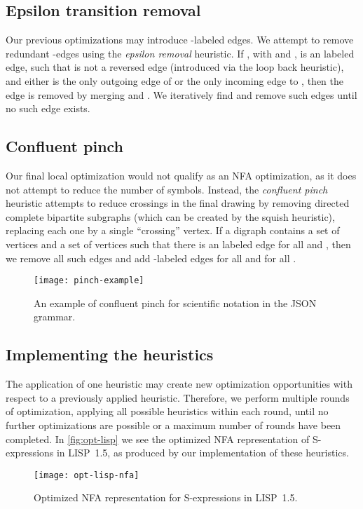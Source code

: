 \documentclass[10pt]{llncs}
\begin{document}
\subsection{Epsilon transition removal}
Our previous optimizations may introduce -labeled edges. We attempt to remove redundant -edges using the \emph{epsilon removal} heuristic. If , with  and , is an  labeled edge, such that  is not a reversed edge (introduced via the loop back heuristic), and either  is the only outgoing edge of  or the only incoming edge to , then the edge  is removed by merging  and . We iteratively find and remove such edges until no such edge exists.

\subsection{Confluent pinch}
Our final local optimization would not qualify as an NFA optimization, as it does not attempt to reduce the number of symbols. Instead, the \emph{confluent pinch} heuristic attempts to reduce crossings in the final drawing by removing directed complete bipartite subgraphs (which can be created by the squish heuristic), replacing each one by a single ``crossing'' vertex. If a digraph contains a set of vertices  and a set of vertices  such that there is an  labeled edge  for all  and , then we remove all such edges and add -labeled edges  for all  and  for all .

\begin{figure}
\centering
\texttt{[image: pinch-example]}
\caption{An example of confluent pinch for scientific notation in the JSON grammar.}
\label{fig:confluent-pinch}
\end{figure}

\subsection{Implementing the heuristics}
The application of one heuristic may create new optimization opportunities with respect to a previously applied heuristic. Therefore, we perform multiple rounds of optimization, applying all possible heuristics within each round, until no further optimizations are possible or a maximum number of rounds have been completed. In \autoref{fig:opt-lisp} we see the optimized NFA representation of S-expressions in LISP~1.5, as produced by our implementation of these heuristics.

\begin{figure}
\centering
\texttt{[image: opt-lisp-nfa]}
\caption{Optimized NFA representation for S-expressions in LISP~1.5.}
\label{fig:opt-lisp}
\end{figure}
\end{document}
